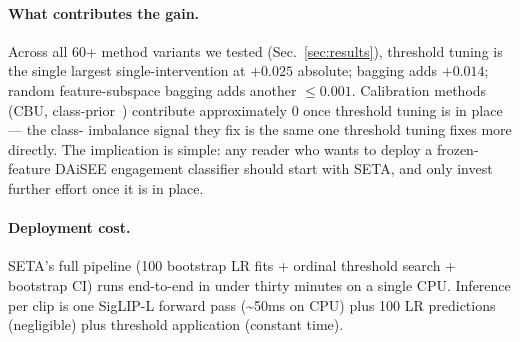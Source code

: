 \paragraph{What contributes the gain.} Across all 60+ method variants
we tested (Sec.~\ref{sec:results}), threshold tuning is the single
largest single-intervention at $+0.025$ absolute; bagging adds
$+0.014$; random feature-subspace bagging adds another $\le 0.001$.
Calibration methods (CBU, class-prior~\cite{menon2021logit}) contribute
approximately $0$ once threshold tuning is in place --- the class-
imbalance signal they fix is the same one threshold tuning fixes more
directly. The implication is simple: any reader who wants to deploy a
frozen-feature DAiSEE engagement classifier should start with SETA,
and only invest further effort once it is in place.

\paragraph{Deployment cost.} SETA's full pipeline (100 bootstrap LR
fits + ordinal threshold search + bootstrap CI) runs end-to-end in
under thirty minutes on a single CPU. Inference per clip is one
SigLIP-L forward pass (\textasciitilde 50ms on CPU) plus 100 LR
predictions (negligible) plus threshold application (constant time).
